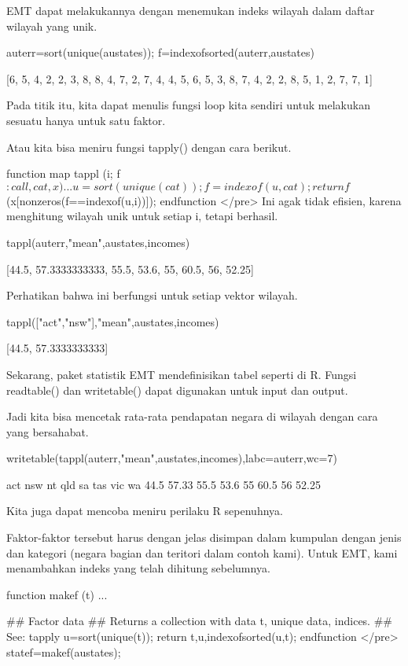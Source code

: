 \documentclass{article}
\begin{document}
EMT dapat melakukannya dengan menemukan indeks wilayah dalam daftar
wilayah yang unik.


\>auterr=sort(unique(austates)); f=indexofsorted(auterr,austates)


    [6,  5,  4,  2,  2,  3,  8,  8,  4,  7,  2,  7,  4,  4,  5,  6,  5,  3,
    8,  7,  4,  2,  2,  8,  5,  1,  2,  7,  7,  1]

Pada titik itu, kita dapat menulis fungsi loop kita sendiri untuk
melakukan sesuatu hanya untuk satu faktor.


Atau kita bisa meniru fungsi tapply() dengan cara berikut.


\>function map tappl (i; f$:call, cat, x) ...


    u=sort(unique(cat));
    f=indexof(u,cat);
    return f$(x[nonzeros(f==indexof(u,i))]);
    endfunction
</pre>
Ini agak tidak efisien, karena menghitung wilayah unik untuk setiap i,
tetapi berhasil.


\>tappl(auterr,"mean",austates,incomes)


    [44.5,  57.3333333333,  55.5,  53.6,  55,  60.5,  56,  52.25]

Perhatikan bahwa ini berfungsi untuk setiap vektor wilayah.


\>tappl(["act","nsw"],"mean",austates,incomes)


    [44.5,  57.3333333333]

Sekarang, paket statistik EMT mendefinisikan tabel seperti di R.
Fungsi readtable() dan writetable() dapat digunakan untuk input dan
output.


Jadi kita bisa mencetak rata-rata pendapatan negara di wilayah dengan
cara yang bersahabat.


\>writetable(tappl(auterr,"mean",austates,incomes),labc=auterr,wc=7)


        act    nsw     nt    qld     sa    tas    vic     wa
       44.5  57.33   55.5   53.6     55   60.5     56  52.25

Kita juga dapat mencoba meniru perilaku R sepenuhnya.


Faktor-faktor tersebut harus dengan jelas disimpan dalam kumpulan
dengan jenis dan kategori (negara bagian dan teritori dalam contoh
kami). Untuk EMT, kami menambahkan indeks yang telah dihitung
sebelumnya.


\>function makef (t) ...


    ## Factor data
    ## Returns a collection with data t, unique data, indices.
    ## See: tapply
    u=sort(unique(t));
    return {{t,u,indexofsorted(u,t)}};
    endfunction
</pre>
\>statef=makef(austates);
\end{document}
